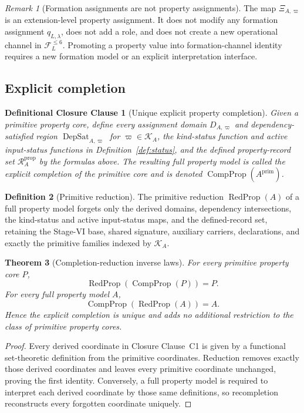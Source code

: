 \documentclass[11pt]{article}
\newcommand{\FVI}{\mathcal F_{L}^{\le 6}}
\newcommand{\DepSat}{\operatorname{DepSat}}
\newcommand{\PropRec}{\mathcal R^{\mathrm{prop}}}
\newcommand{\CompProp}{\operatorname{CompProp}}
\newcommand{\RedProp}{\operatorname{RedProp}}
\newtheorem{closureclause}{Definitional Closure Clause}
\newtheorem{theorem}{Theorem}[section]
\theoremstyle{definition}
\newtheorem{definition}[theorem]{Definition}
\theoremstyle{remark}
\newtheorem{remark}[theorem]{Remark}
\begin{document}
\begin{remark}[Formation assignments are not property assignments]
The map \(\Xi_{A,\varpi}\) is an extension-level property assignment.
It does not modify any formation assignment \(q_{L,\lambda}\), does not add a role, and does not create a new operational channel in \(\FVI\).
Promoting a property value into formation-channel identity requires a new formation model or an explicit interpretation interface.
\end{remark}

\subsection{Explicit completion}

\begin{closureclause}[Unique explicit property completion]
\label{cl:completion}
Given a primitive property core, define every assignment domain \(D_{A,\varpi}\) and dependency-satisfied region \(\DepSat_{A,\varpi}\) for \(\varpi\in\mathcal K_A\), the kind-status function and active input-status functions in Definition~\ref{def:status}, and the defined property-record set \(\PropRec_A\) by the formulas above.
The resulting full property model is called the \emph{explicit completion} of the primitive core and is denoted \(\CompProp(A^{\mathrm{prim}})\).
\end{closureclause}

\begin{definition}[Primitive reduction]
The primitive reduction \(\RedProp(A)\) of a full property model forgets only the derived domains, dependency intersections, the kind-status and active input-status maps, and the defined-record set, retaining the Stage-VI base, shared signature, auxiliary carriers, declarations, and exactly the primitive families indexed by \(\mathcal K_A\).
\end{definition}

\begin{theorem}[Completion-reduction inverse laws]
\label{thm:completion-inverse}
For every primitive property core \(P\),
\[
\RedProp(\CompProp(P))=P.
\]
For every full property model \(A\),
\[
\CompProp(\RedProp(A))=A.
\]
Hence the explicit completion is unique and adds no additional restriction to the class of primitive property cores.
\end{theorem}

\begin{proof}
Every derived coordinate in Closure Clause~C1 is given by a functional set-theoretic definition from the primitive coordinates.
Reduction removes exactly those derived coordinates and leaves every primitive coordinate unchanged, proving the first identity.
Conversely, a full property model is required to interpret each derived coordinate by those same definitions, so recompletion reconstructs every forgotten coordinate uniquely.
\end{proof}
\end{document}
